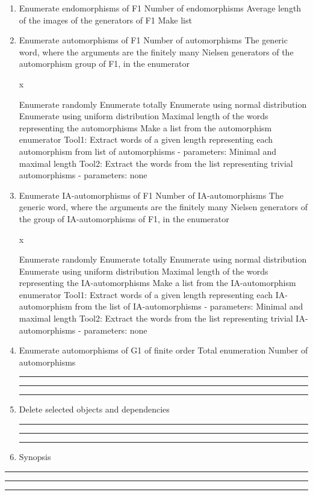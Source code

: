 \begin{enumerate}
\item Enumerate endomorphisms of F1
\subitem Number of endomorphisms
\subsubitem Average length of the images of the generators of F1
\bigskip
\subitem Make list
\bigskip

\item Enumerate automorphisms of F1
\subitem Number of automorphisms
\subsubitem The generic word, where the arguments are the finitely
many Nielsen generators of the automorphism group of F1, in the enumerator

\hskip 2.0in    x

\subsubitem Enumerate randomly
\subsubitem Enumerate totally
\subsubitem Enumerate using normal distribution
\subsubitem Enumerate using uniform distribution
\subsubitem Maximal length of the words representing the automorphisms
\bigskip
\subitem Make a list from the automorphism enumerator
\subsubitem Tool1: Extract words of a given length representing each
automorphism from list of automorphisms - parameters:
Minimal and maximal length
\subsubitem Tool2: Extract the words from the list representing
trivial automorphisms - parameters: none

\vfil\eject
\phantom{}
\bigskip
\item Enumerate IA-automorphisms of F1
\subitem Number of IA-automorphisms
\subsubitem The generic word, where the arguments are the finitely
many Nielsen generators of the group of IA-automorphisms
of F1, in the enumerator

\hskip 2.0in    x

\subsubitem Enumerate randomly
\subsubitem Enumerate totally
\subsubitem Enumerate using normal distribution
\subsubitem Enumerate using uniform distribution
\subsubitem Maximal length of the words representing the IA-automorphisms
\bigskip
\subitem Make a list from the IA-automorphism enumerator
\subsubitem Tool1: Extract words of a given length representing each
IA-automorphism from the list of IA-automorphisms - parameters:
Minimal and maximal length
\subsubitem Tool2: Extract the words from the list representing
trivial IA-automorphisms - parameters: none
\bigskip
\item Enumerate automorphisms of G1 of finite order
\subitem Total enumeration
\subsubitem Number of automorphisms
\bigskip
\hrule\hrule\hrule
\item Delete selected objects and dependencies
\bigskip
\hrule\hrule\hrule
\item Synopsis
\end{enumerate}
\bigskip
\hrule\hrule\hrule
